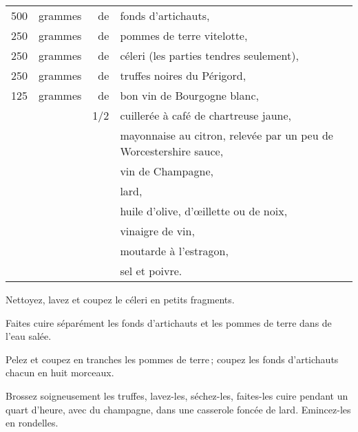 \footnotesize
\begin{longtable}{rrrp{16em}}
    500 & grammes & de  & fonds d'artichauts,                                                             \\
    250 & grammes & de  & pommes de terre vitelotte,                                                      \\
    250 & grammes & de  & céleri (les parties tendres seulement),                                         \\
    250 & grammes & de  & truffes noires du Périgord,                                                     \\
    125 & grammes & de  & bon vin de Bourgogne blanc,                                                     \\
        &         & 1/2 & cuillerée à café de chartreuse jaune,                                           \\
        &         &     & mayonnaise au citron, relevée par un peu de Worcestershire sauce,               \\
        &         &     & vin de Champagne,                                                               \\
        &         &     & lard,                                                                           \\
        &         &     & huile d'olive, d'œillette ou de noix,                                           \\
        &         &     & vinaigre de vin,                                                                \\
        &         &     & moutarde à l'estragon,                                                          \\
        &         &     & sel et poivre.                                                                  \\
\end{longtable}
\normalsize

Nettoyez, lavez et coupez le céleri en petits fragments.

Faites cuire séparément les fonds d'artichauts et les pommes de terre dans de
l'eau salée.

Pelez et coupez en tranches les pommes de terre ; coupez les fonds d'artichauts
chacun en huit morceaux.

Brossez soigneusement les truffes, lavez-les, séchez-les, faites-les cuire
pendant un quart d'heure, avec du champagne, dans une casserole foncée de lard.
Emincez-les en rondelles.

